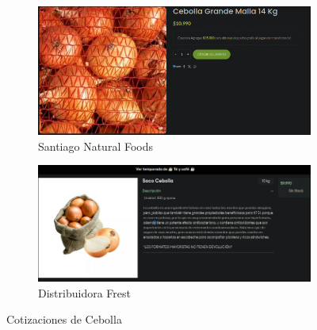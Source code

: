 \documentclass[12pt]{article}
\begin{document}
    \begin{figure}[H]
        \centering
        \begin{subfigure}{0.48\textwidth}
            \centering
            \includegraphics[width=\linewidth]{nat} %
            \caption{Santiago Natural Foods}
            \label{fig:santiago_natural_foods_cebolla}
        \end{subfigure}
        \hfill
        \begin{subfigure}{0.48\textwidth}
            \centering
            \includegraphics[width=\linewidth]{fres} %
            \caption{Distribuidora Frest}
            \label{fig:distribuidora_frest}
        \end{subfigure}
        \caption{Cotizaciones de Cebolla}
        \label{fig:cotizaciones_cebolla}
    \end{figure}
\newpage
\end{document}
